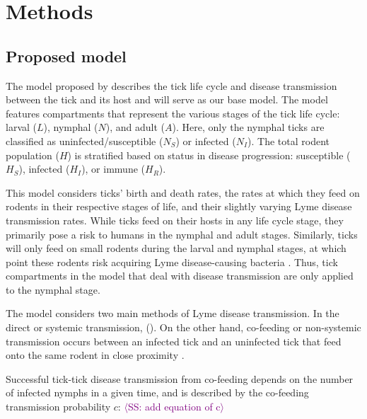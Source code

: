 \documentclass[12pt, centerh1]{article}
\newcommand{\sophie}[1]{{\textcolor{purple}{$\langle$SS: #1$\rangle$}}}
\begin{document}
\section{Methods}

\subsection{Proposed model}
The model proposed by \citet{tosato2021host} describes the tick life cycle and disease transmission between the tick and its host and will serve as our base model. The model features compartments that represent the various stages of the tick life cycle: larval ($L$), nymphal ($N$), and adult ($A$). Here, only the nymphal ticks are classified as uninfected/susceptible ($N_S$) or infected ($N_I$). The total rodent population ($H$) is stratified based on status in disease progression: susceptible ($H_S$), infected ($H_I$), or immune ($H_R$).

This model considers ticks' birth and death rates, the rates at which they feed on rodents in their respective stages of life, and their slightly varying Lyme disease transmission rates. While ticks feed on their hosts in any life cycle stage, they primarily pose a risk to humans in the nymphal and adult stages. Similarly, ticks will only feed on small rodents during the larval and nymphal stages, at which point these rodents risk acquiring Lyme disease-causing bacteria \citep{borrelia_shapiro}. Thus, tick compartments in the model that deal with disease transmission are only applied to the nymphal stage.

The model considers two main methods of Lyme disease transmission. In the direct or systemic transmission, (). On the other hand, co-feeding or non-systemic transmission occurs between an infected tick and an uninfected tick that feed onto the same rodent in close proximity \citep{voordouw2015co}. 



Successful tick-tick disease transmission from co-feeding depends on the number of infected nymphs in a given time, and is described by the co-feeding transmission probability $c$: \sophie{add equation of c}
\end{document}
